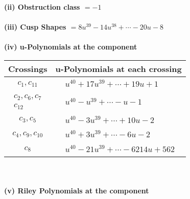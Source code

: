 \documentclass[1p]{elsarticle_modified}
\theoremstyle{definition}
\begin{document}
\flushleft \textbf{(ii) Obstruction class $= -1$}\\~\\
\flushleft \textbf{(iii) Cusp Shapes $= 8 u^{39}-14 u^{38}+\cdots-20 u-8$}\\~\\
\newpage\renewcommand{\arraystretch}{1}
\flushleft \textbf{(iv) u-Polynomials at the component}\newline \\
\begin{tabular}{m{50pt}|m{274pt}}
Crossings & \hspace{64pt}u-Polynomials at each crossing \\
\hline $$\begin{aligned}c_{1},c_{11}\end{aligned}$$&$\begin{aligned}
&u^{40}+17 u^{39}+\cdots+19 u+1
\end{aligned}$\\
\hline $$\begin{aligned}c_{2},c_{6},c_{7}\\c_{12}\end{aligned}$$&$\begin{aligned}
&u^{40}- u^{39}+\cdots- u-1
\end{aligned}$\\
\hline $$\begin{aligned}c_{3},c_{5}\end{aligned}$$&$\begin{aligned}
&u^{40}-3 u^{39}+\cdots+10 u-2
\end{aligned}$\\
\hline $$\begin{aligned}c_{4},c_{9},c_{10}\end{aligned}$$&$\begin{aligned}
&u^{40}+3 u^{39}+\cdots-6 u-2
\end{aligned}$\\
\hline $$\begin{aligned}c_{8}\end{aligned}$$&$\begin{aligned}
&u^{40}-21 u^{39}+\cdots-6214 u+562
\end{aligned}$\\
\hline
\end{tabular}\\~\\
\newpage\renewcommand{\arraystretch}{1}
\flushleft \textbf{(v) Riley Polynomials at the component}\newline \\
\end{document}
